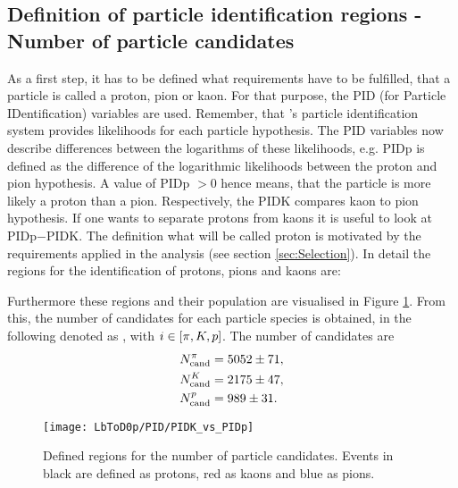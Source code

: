 \subsection{Definition of particle identification regions - Number of particle candidates}
\label{sec:PIDCalib_Ncand}
As a first step, it has to be defined what requirements have to be fulfilled, that a particle is called a proton, pion or kaon.
For that purpose, the PID (for Particle IDentification) variables are used.
Remember, that \lhcb's particle identification system provides likelihoods for each particle hypothesis.
The PID variables now describe differences between the logarithms of these likelihoods, e.g. PIDp is defined as the difference of the logarithmic likelihoods between the proton and pion hypothesis.
A value of PIDp $>0$ hence means, that the particle is more likely a proton than a pion.
Respectively, the PIDK compares kaon to pion hypothesis.
If one wants to separate protons from kaons it is useful to look at PIDp$-$PIDK.
The definition what will be called proton is motivated by the requirements applied in the analysis (see section \ref{sec:Selection}). 
In detail the regions for the identification of protons, pions and kaons are:


Furthermore these regions and their population are visualised in Figure \ref{fig:PIDregions}. 
From this, the number of candidates for each particle species is obtained, in the following denoted as , with $i \in \left[\pi, {K}, {p}\right]$. 
The number of candidates are
\begin{align}
    N_{\text{cand}}^{\pi}     &= 5052 \pm 71, \\ 
    N_{\text{cand}}^{{K}}   &= 2175 \pm 47, \\ 
    N_{\text{cand}}^{{p}} &= 989 \pm 31.
\end{align}
\begin{figure}[ptb]
	\centering
	\texttt{[image: LbToD0p/PID/PIDK\_vs\_PIDp]}
	\caption{Defined regions for the number of particle candidates.
             Events in black are defined as protons, red as kaons and blue as pions.}
	\label{fig:PIDregions}
\end{figure}

